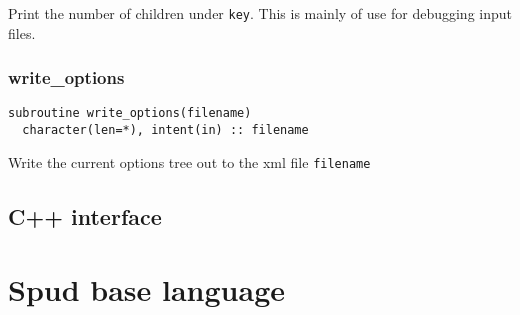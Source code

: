 \documentclass[a4paper, 11pt]{book}
\begin{document}
Print the number of children under \lstinline+key+. This is mainly of use
for debugging input files.

\subsection{write\_options}

\begin{lstlisting}
subroutine write_options(filename) 
  character(len=*), intent(in) :: filename
\end{lstlisting}

Write the current options tree out to the xml file \lstinline+filename+

\section{C++ interface}
\lstset{language=C++}

\chapter{Spud base language}
\end{document}
